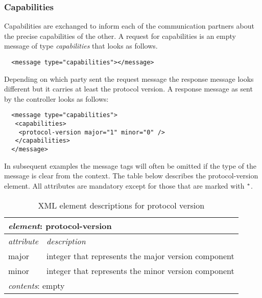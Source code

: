 \documentclass{article}
\begin{document}

  \subsubsection{Capabilities}

   Capabilities are exchanged to inform each of the communication partners
   about the precise capabilities of the other. A request for capabilities
   is an empty message of type \textit{capabilities} that looks as follows.

   \small \begin{verbatim}
  <message type="capabilities"></message>\end{verbatim}
  \normalsize

   \noindent Depending on which party sent the request message the response
   message looks different but it carries at least the protocol version. A
   response message as sent by the controller looks as follows:

   \small \begin{verbatim}
  <message type="capabilities">
   <capabilities>
    <protocol-version major="1" minor="0" />
   </capabilities>
  </message>\end{verbatim}
  \normalsize

   In subsequent examples the message tags will often be omitted if the type of
   the message is clear from the context. The table below describes the
   protocol-version element. All attributes are mandatory except for those that
   are marked with $\sp{*}$.

   \begin{table}[H]
    \begin{center}
    \begin{tabular}{|l|l|}
      \hline
       \multicolumn{2}{|l|}{\textit{element}: protocol-version} \\
      \hline \hline
       \textit{attribute} & \textit{description} \\
      \hline
       major      & integer that represents the major version component \\
       minor      & integer that represents the minor version component \\
      \hline
       \multicolumn{2}{|l|}{\textit{contents}: empty} \\
      \hline
    \end{tabular}
    \end{center}
    \caption{XML element descriptions for protocol version}
   \end{table}
\end{document}
